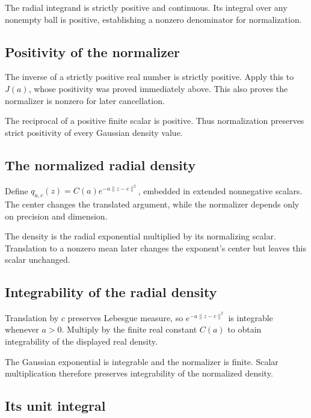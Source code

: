 \documentclass[11pt,a4paper]{article}
\begin{document}
The radial integrand is strictly positive and continuous. Its integral over any nonempty ball is positive, establishing a nonzero denominator for normalization.


\subsection{\texorpdfstring{Positivity of the normalizer}{Positivity of the normalizer}}


The inverse of a strictly positive real number is strictly positive. Apply this to \(J(a)\), whose positivity was proved immediately above. This also proves the normalizer is nonzero for later cancellation.



The reciprocal of a positive finite scalar is positive. Thus normalization preserves strict positivity of every Gaussian density value.


\subsection{\texorpdfstring{The normalized radial density}{The normalized radial density}}


Define \(q_{a,c}(z)=C(a)e^{-a\|z-c\|^2}\), embedded in extended nonnegative scalars. The center changes the translated argument, while the normalizer depends only on precision and dimension.



The density is the radial exponential multiplied by its normalizing scalar. Translation to a nonzero mean later changes the exponent's center but leaves this scalar unchanged.


\subsection{\texorpdfstring{Integrability of the radial density}{Integrability of the radial density}}


Translation by \(c\) preserves Lebesgue measure, so \(e^{-a\|z-c\|^2}\) is integrable whenever \(a>0\). Multiply by the finite real constant \(C(a)\) to obtain integrability of the displayed real density.



The Gaussian exponential is integrable and the normalizer is finite. Scalar multiplication therefore preserves integrability of the normalized density.


\subsection{\texorpdfstring{Its unit integral}{Its unit integral}}
\end{document}
